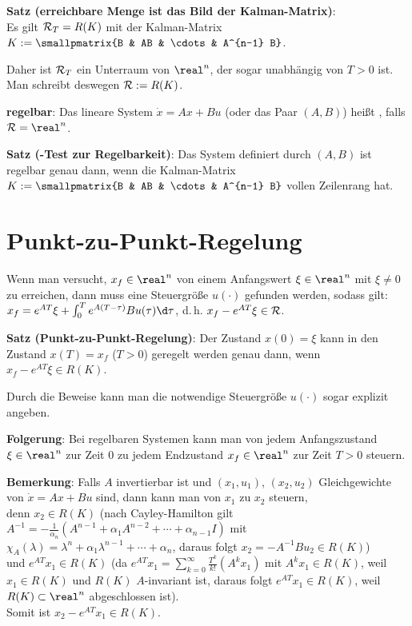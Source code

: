\linie

\textbf{Satz (erreichbare Menge ist das Bild der Kalman-Matrix)}:\\
Es gilt $\mathcal{R}_T = R(K)$ mit der Kalman-Matrix
$K := \smallpmatrix{B & AB & \cdots & A^{n-1} B}$.

Daher ist $\mathcal{R}_T$ ein Unterraum von $\real^n$, der sogar unabhängig von $T > 0$ ist.
Man schreibt deswegen $\mathcal{R} := R(K)$.

\textbf{regelbar}:
Das lineare System $\dot{x} = Ax + Bu$ (oder das Paar $(A, B)$) heißt
, falls $\R = \real^n$.

\textbf{Satz (-Test zur Regelbarkeit)}:
Das System definiert durch $(A, B)$ ist regelbar genau dann,
wenn die Kalman-Matrix $K := \smallpmatrix{B & AB & \cdots & A^{n-1} B}$ vollen Zeilenrang hat.

\section{%
    Punkt-zu-Punkt-Regelung%
}

Wenn man versucht, $x_f \in \real^n$ von einem Anfangswert $\xi \in \real^n$ mit $\xi \not= 0$
zu erreichen, dann muss eine Steuergröße $u(\cdot)$ gefunden werden,
sodass gilt:
$x_f = e^{AT}\xi + \int_0^T e^{A(T-\tau)} Bu(\tau) \d\tau$,
d.\,h. $x_f - e^{AT}\xi \in \mathcal{R}$.

\textbf{Satz (Punkt-zu-Punkt-Regelung)}:
Der Zustand $x(0) = \xi$ kann in den Zustand $x(T) = x_f$ ($T > 0$) geregelt werden genau dann,
wenn $x_f - e^{AT} \xi \in R(K)$.

Durch die Beweise kann man die notwendige Steuergröße $u(\cdot)$ sogar explizit angeben.

\textbf{Folgerung}:
Bei regelbaren Systemen kann man von jedem Anfangszustand $\xi \in \real^n$
zur Zeit $0$ zu jedem Endzustand $x_f \in \real^n$ zur Zeit $T > 0$ steuern.

\textbf{Bemerkung}:
Falls $A$ invertierbar ist und $(x_1, u_1)$, $(x_2, u_2)$ Gleichgewichte von
$\dot{x} = Ax + Bu$ sind, dann kann man von $x_1$ zu $x_2$ steuern,\\
denn $x_2 \in R(K)$
(nach Cayley-Hamilton gilt $A^{-1} = -\frac{1}{\alpha_n} (A^{n-1} + \alpha_1 A^{n-2} + \dotsb +
\alpha_{n-1} I)$ mit $\chi_A(\lambda) = \lambda^n + \alpha_1 \lambda^{n-1} + \dotsb + \alpha_n$,
daraus folgt $x_2 = -A^{-1} Bu_2 \in R(K)$)\\
und $e^{AT} x_1 \in R(K)$
(da $e^{AT} x_1 = \sum_{k=0}^\infty \frac{T^k}{k!} (A^k x_1)$
mit $A^k x_1 \in R(K)$, weil $x_1 \in R(K)$ und $R(K)$ $A$-invariant ist,
daraus folgt $e^{AT} x_1 \in R(K)$, weil $R(K) \subset \real^n$ abgeschlossen ist).\\
Somit ist $x_2 - e^{AT} x_1 \in R(K)$.

